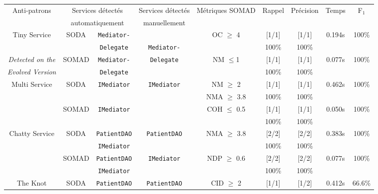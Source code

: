 
\begin{table*}
\centering{}\centering{}%
\begin{tabular}{|c|c|c|c|c|c|c|c|c|}
\hline 
\multirow{2}{*}{Anti-patrons}  & \multicolumn{2}{c|}{Services détectés}  & Services détectés  & \multirow{2}{*}{Métriques SOMAD}  & \multirow{2}{*}{Rappel}  & \multirow{2}{*}{Précision}  & \multirow{2}{*}{Temps}  & \multirow{2}{*}{F$_{1}$}\tabularnewline
 & \multicolumn{2}{c|}{automatiquement}  & manuellement  &  &  &  &  & \tabularnewline
\hline 
\hline 
\multirow{2}{*}{Tiny Service} & \multirow{2}{*}{SODA}  & \texttt{Mediator-}  &  & \multirow{2}{*}{OC $\geqslant$ 4 }  & {[}1/1{]}  & {[}1/1{]}  & \multirow{2}{*}{0.194s}  & \multirow{2}{*}{100\%}\tabularnewline
 &  & \texttt{Delegate}  & \texttt{Mediator-}  &  & 100\%  & 100\%  &  & \tabularnewline
\cline{2-3} \cline{6-9} 
\textit{Detected on the}   & \multirow{2}{*}{SOMAD}  & \texttt{Mediator-}  & \texttt{Delegate}  & \multirow{2}{*}{NM $\leqslant$1 }  & {[}1/1{]}  & {[}1/1{]}  & \multirow{2}{*}{0.077s }  & \multirow{2}{*}{100\%}\tabularnewline
\textit{ Evolved Version} &  & \texttt{Delegate}  &  &  & 100\%  & 100\%  &  & \tabularnewline
\hline 
\hline 
\multirow{4}{*}{Multi Service }  & \multirow{2}{*}{SODA}  & \multirow{2}{*}{\texttt{IMediator} }  & \multirow{4}{*}{\texttt{IMediator} }  & NM $\geqslant$ 2  & {[}1/1{]}  & {[}1/1{]}  & \multirow{2}{*}{0.462s}  & \multirow{2}{*}{100\% }\tabularnewline
 &  &  &  & NMA $\geqslant$ 3.8  & 100\%  & 100\%  &  & \tabularnewline
\cline{2-3} \cline{6-9} 
 & \multirow{2}{*}{SOMAD}  & \multirow{2}{*}{\texttt{IMediator} }  &  & \multirow{2}{*}{COH $\leqslant$ 0.5 }  & {[}1/1{]}  & {[}1/1{]}  & \multirow{2}{*}{0.050s}  & \multirow{2}{*}{100\% }\tabularnewline
 &  &  &  &  & 100\%  & 100\%  &  & \tabularnewline
\hline 
\hline 
\multirow{4}{*}{Chatty Service}  & \multirow{2}{*}{SODA}  & \texttt{PatientDAO}  & \multirow{2}{*}{\texttt{PatientDAO}}  & \multirow{2}{*}{NMA $\geqslant$ 3.8}  & {[}2/2{]}  & {[}2/2{]}  & \multirow{2}{*}{0.383s}  & \multirow{2}{*}{100\%}\tabularnewline
 &  & \texttt{IMediator}  &  &  & 100\%  & 100\%  &  & \tabularnewline
\cline{2-3} \cline{6-9} 
 & \multirow{2}{*}{SOMAD}  & \texttt{PatientDAO}  & \multirow{2}{*}{\texttt{IMediator}}  & \multirow{2}{*}{NDP $\geqslant$ 0.6 }  & {[}2/2{]}  & {[}2/2{]}  & \multirow{2}{*}{0.077s}  & \multirow{2}{*}{100\%}\tabularnewline
 &  & \texttt{IMediator}  &  &  & 100\%  & 100\%  &  & \tabularnewline
\cline{2-3} \cline{6-9} 
\hline 
\hline 
\multirow{4}{*}{The Knot}  & \multirow{2}{*}{SODA}  & \texttt{PatientDAO}  & \multirow{4}{*}{\texttt{PatientDAO}}  & \multirow{2}{*}{CID $\geqslant$ 2 }  & {[}1/1{]}  & {[}1/2{]}  & \multirow{2}{*}{0.412s}  & \multirow{2}{*}{66.6\% }\tabularnewline

\end{tabular}
\end{table*}
